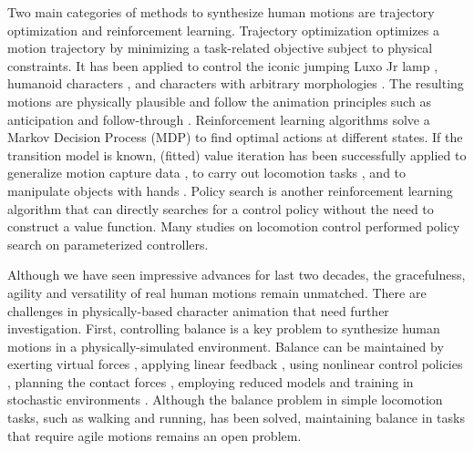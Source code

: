 Two main categories of methods to synthesize human motions are trajectory optimization and reinforcement learning. Trajectory optimization optimizes a motion trajectory by minimizing a task-related objective subject to physical constraints. It has been applied to control the iconic jumping Luxo Jr lamp \cite{Witkin:1988}, humanoid characters \cite{Liu:2002,Jain:2009,Ye:2010}, and characters with arbitrary morphologies \cite{Wampler:2009}. The resulting motions are physically plausible and follow the animation principles such as anticipation and follow-through \cite{thomas:1995}.  Reinforcement learning algorithms solve a Markov Decision Process (MDP) to find optimal actions at different states. If the transition model is known, (fitted) value iteration has been successfully applied to generalize motion capture data \cite{Treuille:2007:NCA,Levine:2012:CCC}, to carry out locomotion tasks \cite{Coros:2009:RTC}, and to manipulate objects with hands \cite{Multifinger2013}. Policy search \cite{Ng:2000:PPS} is another reinforcement learning algorithm that can directly searches for a control policy without the need to construct a value function. Many studies on locomotion control \cite{Yin08,Wang:2009,Coros:2011,Wang:2012,Geijtenbeek:2013} performed policy search on parameterized controllers. 

Although we have seen impressive advances for last two decades, the gracefulness, agility and versatility of real human motions remain unmatched. There are challenges in physically-based character animation that need further investigation. First, controlling balance is a key problem to synthesize human motions in a physically-simulated environment. Balance can be maintained by exerting virtual forces \cite{Pratt2001,Coros2010}, applying linear feedback \cite{Laszlo:1996,Yin:2007,daSilva:2008,Coros2010}, using nonlinear control policies \cite{Muico:2009}, planning the contact forces \cite{Muico:2009,Tan:2012}, employing reduced models \cite{Tsai:2010,Kwon:2010,Mordatch:2010:RPL,Coros2010,Ye:2010} and training in stochastic environments \cite{Wang:2010}. Although the balance problem in simple locomotion tasks, such as walking and running, has been solved, maintaining balance in tasks that require agile motions remains an open problem. 

